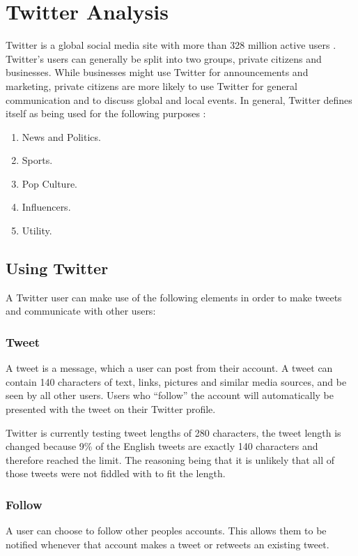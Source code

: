 \section{Twitter Analysis}\label{sec:twitter-analysis}
Twitter is a global social media site with more than 328 million active users
\citep{aboutTwitter}. Twitter's users can generally be split into two groups,
private citizens and businesses. While businesses might use Twitter for
announcements and marketing, private citizens are more likely to use Twitter for
general communication and to discuss global and local events. In general,
Twitter defines itself as being used for the following purposes
\citep{StartingTwitter}:

\begin{enumerate}    
  \item News and Politics.
  \item Sports.
  \item Pop Culture. 
  \item Influencers.
  \item Utility.
\end{enumerate} %

\subsection{Using Twitter}
A Twitter user can make use of the following elements \citep{StartingTwitter}
in order to make tweets and communicate with other users:

\subsubsection{Tweet}
A tweet is a message, which a user can post from their account. A tweet can
contain 140 characters\citep{StartingTwitter2} of text, links, pictures and
similar media sources, and be seen by all other users. Users who ``follow'' the
account will automatically be presented with the tweet on their Twitter profile.

Twitter is currently testing tweet lengths of 280 characters, the tweet length
is changed because 9\% of the English tweets are exactly 140 characters and
therefore reached the limit. The reasoning being that it is unlikely that all of
those tweets were not fiddled with to fit the length\cite{TweetL}.

\subsubsection{Follow}
A user can choose to follow other peoples accounts. This allows them to be
notified whenever that account makes a tweet or retweets an existing tweet.

